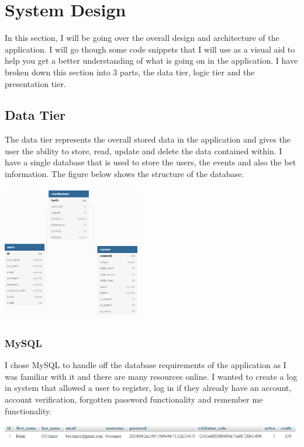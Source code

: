\chapter{System Design}
In this section, I will be going over the overall design and architecture of the application. I will go though some code snippets that I will use as a visual aid to help you get a better understanding of what is going on in the application. I have broken down this section into 3 parts, the data tier, logic tier and the presentation tier. 

\section{Data Tier}
The data tier represents the overall stored data in the application and gives the user the ability to store, read, update and delete the data contained within. I have a single database that is used to store the users, the events and also the bet information. The figure below shows the structure of the database.

\includegraphics[width=6cm, height=6cm]{img/DatabaseFinal.png}


\subsection{MySQL}
I chose MySQL to handle off the database requirements of the application as I was familiar with it and there are many resources online. I wanted to create a log in system that allowed a user to register, log in if they already have an account, account verification, forgotten password functionality and remember me functionality. 

\includegraphics[width=\textwidth,height=\textheight,keepaspectratio]{img/Users.png}

